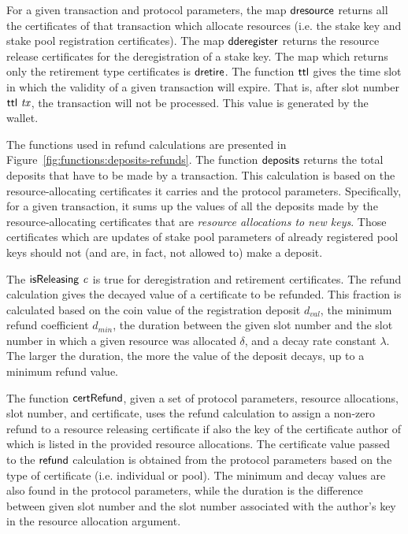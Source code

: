 \documentclass[11pt,a4paper,dvipsnames]{article}
\theoremstyle{definition}
\theoremstyle{definition}
\begin{document}
For a given transaction and protocol parameters, the map $\mathsf{dresource}$
returns all the certificates of that transaction which allocate resources
(i.e. the stake key and stake pool registration certificates). The map
$\mathsf{dderegister}$ returns the resource release certificates for the
deregistration of a stake key. The map which returns only
the retirement type certificates is $\mathsf{dretire}$. The function $\mathsf{ttl}$ gives the
time slot in which the validity of a given transaction will expire. That is,
after slot number $\mathsf{ttl}~\mathit{tx}$, the transaction will not be processed.
This value is generated by the wallet.

The functions used in refund calculations are presented in
Figure~\ref{fig:functions:deposits-refunds}.
The function
$\mathsf{deposits}$ returns the total deposits that have to be made by a transaction.
This calculation is
based on the resource-allocating certificates it carries and the protocol parameters.
Specifically, for a given transaction,
it sums up the values of all the deposits made by the resource-allocating
certificates that are \textit{resource allocations to new keys}.  Those
certificates which are
updates of stake pool parameters of already registered pool keys should not
(and are, in fact, not allowed to) make a deposit.

The $\mathsf{isReleasing}~\mathit{c}$ is true for deregistration and retirement
certificates. The refund calculation gives the decayed value of a
certificate to be refunded. This fraction is calculated
based on the coin value of the registration deposit $d_{val}$, the minimum
refund coefficient $d_{min}$, the
duration between the given slot number and the slot number in
which a given resource was allocated $\delta$, and a decay rate constant $\lambda$.
The larger the duration, the more
the value of the deposit decays, up to a minimum refund value.

The function $\mathsf{certRefund}$, given a set of protocol parameters, resource
allocations, slot number, and certificate, uses the refund calculation to
assign a non-zero refund to a resource releasing certificate if also the key of
the certificate author of which is listed in the provided resource allocations.
The certificate value passed to the $\mathsf{refund}$ calculation is obtained from
the protocol parameters based on the type of certificate (i.e. individual or pool).
The minimum and decay values are also found in the protocol parameters, while
the duration is the difference between given slot number and the slot
number associated with the author's key in the resource allocation argument.
\end{document}
